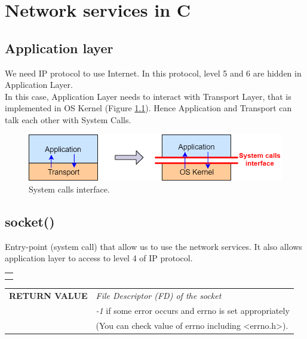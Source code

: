 \chapter{Network services in C}\label{networkC}
\section{Application layer}
We need IP protocol to use Internet. In this protocol, level 5 and 6 are hidden in Application Layer.\\
In this case, Application Layer needs to interact with Transport Layer, that is implemented in OS Kernel (Figure \ref{app_kernel}). Hence Application and Transport can talk each other with System Calls.
\begin{figure}[h]
\centering
\includegraphics[scale=0.5]{Images/NetworkC/application}\caption{\footnotesize{System calls interface.}}\label{app_kernel}
\end{figure}

\section{socket()}\label{socket}
Entry-point (system call) that allow us to use the network services. It also allows application layer to access to level 4 of IP protocol. 
\begin{center}
\begin{tabular}{c}
\begin{lstlisting}[linewidth=270pt, basicstyle=\footnotesize\sffamily,]
#include <sys/types.h>
#include <sys/socket.h>

int socket(int domain, int type, int protocol);\\
\end{lstlisting}
\end{tabular}
\end{center}

\begin{table}[h]
\centering
\begin{tabular}{rcl}
\textbf{RETURN VALUE} & \multicolumn{2}{l}{\textit{File Descriptor (FD) of the socket} }\\
{} & \multicolumn{2}{l}{\textit{-1} if some error occurs and errno is set appropriately}\\
{} & \multicolumn{2}{l}{(You can check value of errno including <errno.h>).}\\
\end{tabular}
\end{table}

